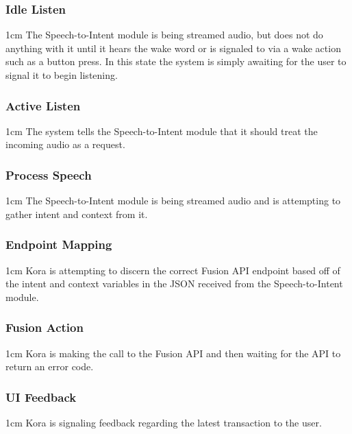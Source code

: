 \documentclass[onecolumn, draftclsnofoot,10pt, compsoc]{IEEEtran}
\def \botname{Kora\xspace}
\newenvironment{indentItem}[1][1cm]{\begin{adjustwidth}{#1}{}}{\end{adjustwidth}}
\begin{document}
	\subsubsection{Idle Listen}
	\begin{indentItem}
		The Speech-to-Intent module is being streamed audio, but does not do anything with it until it hears the wake word or is signaled to via a wake action such as a button press.
		In this state the system is simply awaiting for the user to signal it to begin listening.
	\end{indentItem}

	\subsubsection{Active Listen}
	\begin{indentItem}
		The system tells the Speech-to-Intent module that it should treat the incoming audio as a request.
	\end{indentItem}

	\subsubsection{Process Speech}
	\begin{indentItem}
		The Speech-to-Intent module is being streamed audio and is attempting to gather intent and context from it.
	\end{indentItem}

	\subsubsection{Endpoint Mapping}
	\begin{indentItem}
		\botname is attempting to discern the correct Fusion API endpoint based off of the intent and context variables in the JSON received from the Speech-to-Intent module.
	\end{indentItem}

	\subsubsection{Fusion Action}
	\begin{indentItem}
		\botname is making the call to the Fusion API and then waiting for the API to return an error code.
	\end{indentItem}

	\subsubsection{UI Feedback}
	\begin{indentItem}
		\botname is signaling feedback regarding the latest transaction to the user.
	\end{indentItem}
\end{document}
